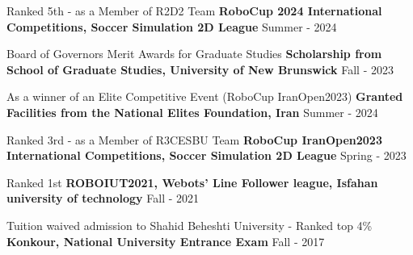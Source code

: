 \begin{cventries}
    
    \cventry
    {Ranked 5th - as a Member of R2D2 Team}
    {\textbf {RoboCup 2024 International Competitions, Soccer Simulation 2D League}}
    {}
    {Summer - 2024}
    {}
    
    
    \cventry
    {Board of Governors Merit Awards for Graduate Studies}
    {\textbf {Scholarship from School of Graduate Studies, University of New Brunswick}}
    {}
    {Fall - 2023}
    {}

    \cventry
    {As a winner of an Elite Competitive Event (RoboCup IranOpen2023)}
    {\textbf {Granted Facilities from the National Elites Foundation, Iran}}
    {}
    {Summer - 2024}
    {}


    \cventry
    {Ranked 3rd - as a Member of R3CESBU Team}
    {\textbf {RoboCup IranOpen2023 International Competitions, Soccer Simulation 2D League}}
    {}
    {Spring - 2023}
    {}

    

    
    \cventry
    {Ranked 1st}
    {\textbf {ROBOIUT2021, Webots’ Line Follower league, Isfahan university of technology}}
    {}
    {Fall - 2021}
    {}




    \cventry
    {Tuition waived admission to Shahid Beheshti University - Ranked top 4\%}
    {\textbf {Konkour, National University Entrance Exam}}
    {}
    {Fall - 2017}
    {}
\end{cventries}